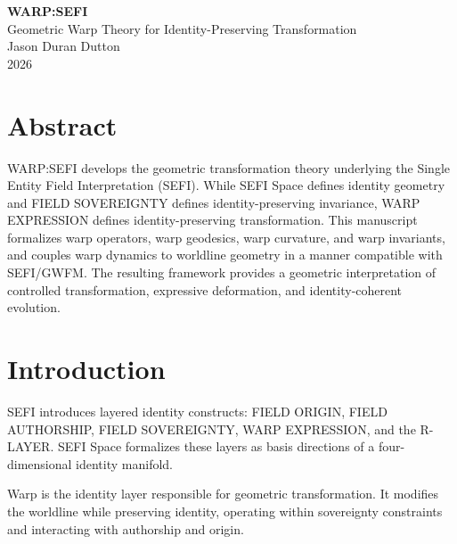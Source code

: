 \documentclass[12pt,twoside]{article}
\begin{document}
\begin{center}
    {\Large \textbf{WARP:SEFI}}\\

\vspace{0.5cm}
    {\large Geometric Warp Theory for Identity-Preserving Transformation}\\

\vspace{0.5cm}
    {\large Jason Duran Dutton}\\

\vspace{0.25cm}
    {\large 2026}
\end{center}

\vspace{1cm}

\section*{Abstract}

WARP:SEFI develops the geometric transformation theory underlying the Single Entity Field
Interpretation (SEFI). While SEFI Space defines identity geometry and FIELD SOVEREIGNTY
defines identity-preserving invariance, WARP EXPRESSION defines identity-preserving
transformation. This manuscript formalizes warp operators, warp geodesics, warp curvature,
and warp invariants, and couples warp dynamics to worldline geometry in a manner
compatible with SEFI/GWFM. The resulting framework provides a geometric interpretation
of controlled transformation, expressive deformation, and identity-coherent evolution.

\vspace{0.5cm}

\section{Introduction}

SEFI introduces layered identity constructs: FIELD ORIGIN, FIELD AUTHORSHIP,
FIELD SOVEREIGNTY, WARP EXPRESSION, and the R-LAYER. SEFI Space formalizes
these layers as basis directions of a four-dimensional identity manifold.

Warp is the identity layer responsible for geometric transformation. It modifies the
worldline while preserving identity, operating within sovereignty constraints and interacting
with authorship and origin.
\end{document}
